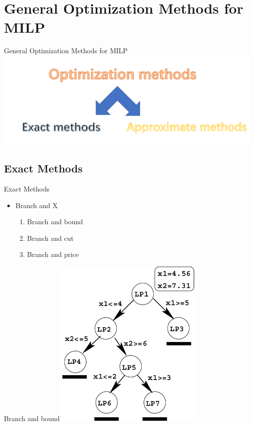\section{General Optimization Methods for MILP}

    \begin{frame}{General Optimization Methods for MILP}
        \centering
        \includegraphics[width = 1\textwidth]{images/opt2.png}
    \end{frame}

    \subsection{Exact Methods}
    \frame{\sectionpage}

    \begin{frame}{Exact Methods}
      \Large
      \begin{spacing}{2}
        \begin{itemize}
          \item<+-> Branch and X
            \begin{enumerate}
            \item<+>  Branch and bound
            \item<+>  Branch and cut
            \item<+>  Branch and price
            \end{enumerate}
        \end{itemize}
      \end{spacing}
    \end{frame}

    \begin{frame}{Branch and bound}
      \centering
      \includegraphics[width = 0.55\textwidth]{images/Branch.png}
    \end{frame}

